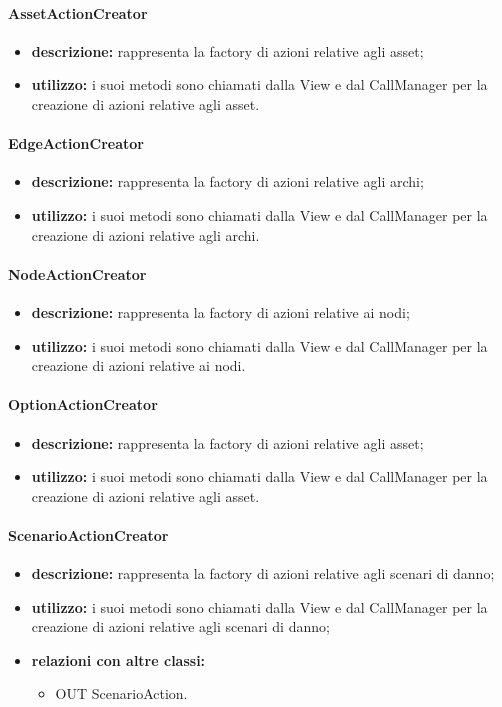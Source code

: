 \paragraph{AssetActionCreator}
\begin{itemize}
	\item \textbf{descrizione:} rappresenta la factory di azioni relative agli asset;
	\item \textbf{utilizzo:} i suoi metodi sono chiamati dalla View e dal CallManager per la creazione di azioni relative agli asset.
\end{itemize}
\paragraph{EdgeActionCreator}
\begin{itemize}
	\item \textbf{descrizione:} rappresenta la factory di azioni relative agli archi;
	\item \textbf{utilizzo:} i suoi metodi sono chiamati dalla View e dal CallManager per la creazione di azioni relative agli archi.
\end{itemize}
\paragraph{NodeActionCreator}
\begin{itemize}
	\item \textbf{descrizione:} rappresenta la factory di azioni relative ai nodi;
	\item \textbf{utilizzo:} i suoi metodi sono chiamati dalla View e dal CallManager per la creazione di azioni relative ai nodi.
\end{itemize}
\paragraph{OptionActionCreator}
\begin{itemize}
	\item \textbf{descrizione:} rappresenta la factory di azioni relative agli asset;
	\item \textbf{utilizzo:} i suoi metodi sono chiamati dalla View e dal CallManager per la creazione di azioni relative agli asset.
\end{itemize}
\paragraph{ScenarioActionCreator}
\begin{itemize}
	\item \textbf{descrizione:} rappresenta la factory di azioni relative agli scenari di danno;
	\item \textbf{utilizzo:} i suoi metodi sono chiamati dalla View e dal CallManager per la creazione di azioni relative agli scenari di danno;
	\item \textbf{relazioni con altre classi:} 
	\begin{itemize}
		\item OUT ScenarioAction.
	\end{itemize}
\end{itemize}
\newpage
